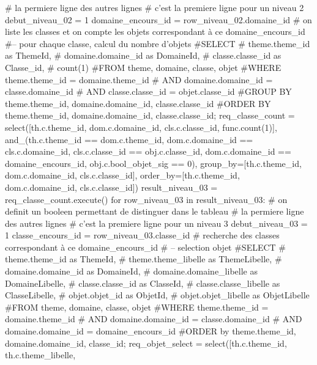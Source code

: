 \documentclass[12pt,titlepage,oneside]{book}
\begin{document}
\begin{lbdpython}
      # la permiere ligne des autres lignes
      # c'est la premiere ligne pour un niveau 2
      debut_niveau_02 = 1
      domaine_encours_id = row_niveau_02.domaine_id
      # on liste les classes et on compte les objets correspondant à ce domaine_encours_id
      #-- pour chaque classe, calcul du nombre d'objets
      #SELECT
      #   theme.theme_id as ThemeId,
      #   domaine.domaine_id as DomaineId,
      #   classe.classe_id as Classe_id,
      #   count(1)
      #FROM theme, domaine, classe, objet
      #WHERE theme.theme_id = domaine.theme_id 
      #  AND domaine.domaine_id = classe.domaine_id
      #  AND classe.classe_id = objet.classe_id
      #GROUP BY theme.theme_id, domaine.domaine_id, classe.classe_id
      #ORDER BY theme.theme_id, domaine.domaine_id, classe.classe_id;
      req_classe_count = select([th.c.theme_id, dom.c.domaine_id,
                                 cls.c.classe_id, func.count(1)],
                         and_(th.c.theme_id == dom.c.theme_id,
                              dom.c.domaine_id == cls.c.domaine_id,
                              cls.c.classe_id == obj.c.classe_id,
                              dom.c.domaine_id == domaine_encours_id,
                              obj.c.bool_objet_sig == 0),
                         group_by=[th.c.theme_id, dom.c.domaine_id, cls.c.classe_id],
                         order_by=[th.c.theme_id, dom.c.domaine_id, cls.c.classe_id])
      result_niveau_03 = req_classe_count.execute()
      for row_niveau_03 in result_niveau_03:
         # on definit un booleen permettant de distinguer dans le tableau
         # la permiere ligne des autres lignes
         # c'est la premiere ligne pour un niveau 3
         debut_niveau_03 = 1
         classe_encours_id = row_niveau_03.classe_id
         # recherche des classes correspondant à ce domaine_encours_id
         # -- selection objet
         #SELECT
         #   theme.theme_id as ThemeId,
         #   theme.theme_libelle as ThemeLibelle,
         #   domaine.domaine_id as DomaineId,
         #   domaine.domaine_libelle as DomaineLibelle,
         #   classe.classe_id as ClasseId,
         #   classe.classe_libelle as ClasseLibelle,
         #   objet.objet_id as ObjetId,
         #   objet.objet_libelle as ObjetLibelle
         #FROM theme, domaine, classe, objet
         #WHERE theme.theme_id = domaine.theme_id
         #  AND domaine.domaine_id = classe.domaine_id
         #  AND domaine.domaine_id = domaine_encours_id
         #ORDER by theme.theme_id, domaine.domaine_id, classe_id;
         req_objet_select = select([th.c.theme_id, th.c.theme_libelle,

\end{lbdpython}
\end{document}
